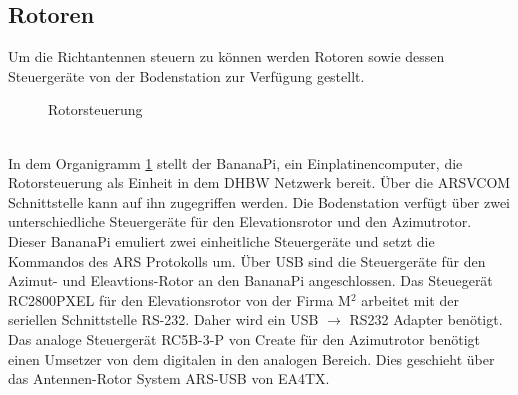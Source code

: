 \subsection{Rotoren}
Um die Richtantennen steuern zu können werden Rotoren sowie dessen Steuergeräte von der Bodenstation zur Verfügung gestellt.
\begin{figure}[h]
	\centering
	
	\caption{Rotorsteuerung}
	\label{fig:azel}
\end{figure}\\
In dem Organigramm \ref{fig:azel} stellt der BananaPi, ein Einplatinencomputer, die Rotorsteuerung als Einheit in dem DHBW Netzwerk bereit. Über die 
ARSVCOM Schnittstelle kann auf ihn zugegriffen werden. Die Bodenstation verfügt über zwei unterschiedliche Steuergeräte für den Elevationsrotor und 
den Azimutrotor. Dieser BananaPi emuliert zwei einheitliche Steuergeräte und setzt die Kommandos des ARS Protokolls um. Über USB sind die 
Steuergeräte für den Azimut- und Eleavtions-Rotor an den BananaPi angeschlossen. Das Steuegerät RC2800PXEL für den 
Elevationsrotor von der Firma M$^2$ arbeitet mit der seriellen Schnittstelle RS-232. Daher wird ein USB $\rightarrow$ RS232 Adapter benötigt. Das 
analoge Steuergerät RC5B-3-P von Create für den Azimutrotor benötigt einen Umsetzer von dem digitalen in den analogen Bereich. Dies geschieht über 
das Antennen-Rotor System ARS-USB von EA4TX. 
\clearpage

